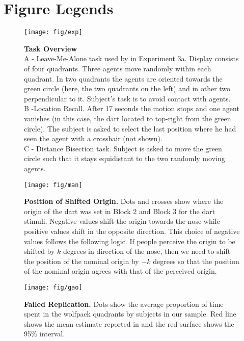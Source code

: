 \documentclass[10pt]{article}
\begin{document}


\section*{Figure Legends}
\begin{figure}[!ht]
\begin{center}
\texttt{[image: fig/exp]}
\end{center}
\caption{
{\bf Task Overview}\\
A - Leave-Me-Alone task used by \cite{gao10} in Experiment 3a. 
Display consists of four quadrants. 
Three agents move randomly within each quadrant. 
In two quadrants the agents are oriented towards the green circle (here, the two quadrants on the left) and in other two perpendicular to it. 
Subject's task is to avoid contact with agents. \\
B -Location Recall. 
After 17 seconds the motion stops and one agent vanishes (in this case, the dart located to top-right from the green circle). 
The subject is asked to select the last position where he had seen the agent with a crosshair (not shown).\\ 
C - Distance Bisection task. 
Subject is asked to move the green circle such that it stays equidistant to the two randomly moving agents. 
}
\label{fig:exp}
\end{figure}

\begin{figure}[!ht]
\begin{center}
\texttt{[image: fig/man]}
\end{center}
\caption{
{\bf Position of Shifted Origin.}
Dots and crosses show where the origin of the dart was set in Block 2 and Block 3 for the dart stimuli. 
Negative values shift the origin towards the nose while positive values shift in the opposite direction.
This choice of negative values follows the following logic. 
If people perceive the origin to be shifted by $k$ degrees in direction of the nose, then we need to shift the position of the nominal origin by $-k$ degrees so that the position of the nominal origin agrees with that of the perceived origin. 
}
\label{fig:man}
\end{figure}

\begin{figure}[!ht]
\begin{center}
\texttt{[image: fig/gao]}
\end{center}
\caption{
{\bf Failed Replication.}
Dots show the average proportion of time spent in the wolfpack quadrants by subjects in our sample. 
Red line shows the mean estimate reported in \cite{gao10} and the red surface shows the 95\% interval.
}
\label{fig:gao}
\end{figure}
\end{document}
